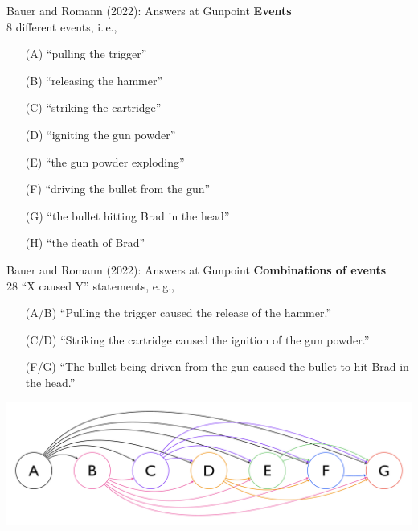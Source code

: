 \documentclass[xcolor=table,9pt,aspectratio=169]{beamer}
\begin{document}
\begin{frame}{\vspace*{10mm}Bauer and Romann (2022): Answers at Gunpoint}
\vspace*{-5mm}
\textbf{Events}\\
8 different events, i.\,e.,
\begin{itemize}
   \item[(A)] ``pulling the trigger''
   \item[(B)] ``releasing the hammer''
   \item[(C)] ``striking the cartridge''
   \item[(D)] ``igniting the gun powder''
   \item[(E)] ``the gun powder exploding''
   \item[(F)] ``driving the bullet from the gun''
   \item[(G)] ``the bullet hitting Brad in the head''
   \item[(H)] ``the death of Brad''
\end{itemize}
\vfill
\end{frame}


\begin{frame}{\vspace*{10mm}Bauer and Romann (2022): Answers at Gunpoint}
\vspace*{-5mm}
\textbf{Combinations of events}\\
28 ``X caused Y'' statements, e.\,g.,
\begin{itemize}
   \item[(A/B)] ``Pulling the trigger caused the release of the hammer.''
   \item[(C/D)] ``Striking the cartridge caused the ignition of the gun powder.''
   \item[(F/G)] ``The bullet being driven from the gun caused the bullet to hit Brad in the head.''
\end{itemize}
\hfill
\begin{center}
   \includegraphics[width=.8\linewidth]{figures/combinations.pdf}
\end{center}
\end{frame}
\end{document}
